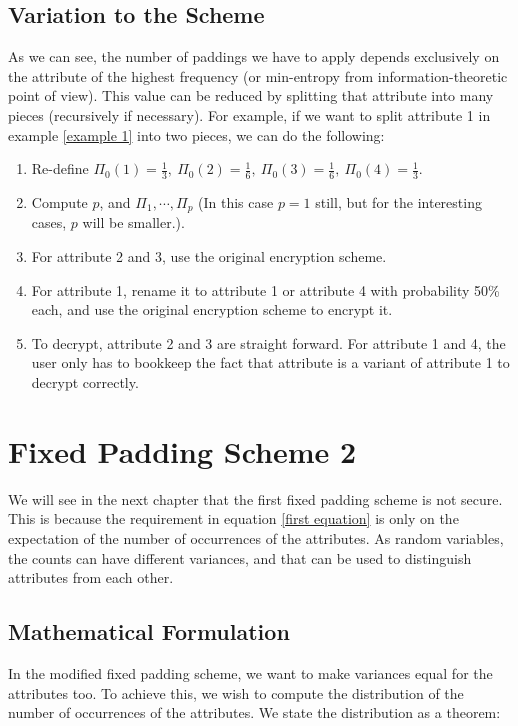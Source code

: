 \subsection{Variation to the Scheme} 
As we can see, the number of paddings we have to apply depends exclusively on the attribute of the highest frequency (or min-entropy from information-theoretic point of view). This value can be reduced by splitting that attribute into many pieces (recursively if necessary). For example, if we want to split attribute 1 in example \ref{example 1} into two pieces, we can do the following:
\begin{enumerate}
\item Re-define $\Pi_0(1) = \frac{1}{3}, \ \Pi_0(2) = \frac{1}{6}, \ \Pi_0(3) = \frac{1}{6}, \ \Pi_0(4) = \frac{1}{3}$.
\item Compute $p$, and $\Pi_1, \cdots, \Pi_p$ (In this case $p = 1$ still, but for the interesting cases, $p$ will be smaller.).
\item For attribute 2 and 3, use the original encryption scheme.
\item For attribute 1, rename it to attribute 1 or attribute 4 with probability 50\% each, and use the original encryption scheme to encrypt it.
\item To decrypt, attribute 2 and 3 are straight forward. For attribute 1 and 4, the user only has to bookkeep the fact that attribute is a variant of attribute 1 to decrypt correctly.
\end{enumerate}


\section{Fixed Padding Scheme 2}
We will see in the next chapter that the first fixed padding scheme is not secure. This is because the requirement in equation \ref{first equation} is only on the expectation of the number of occurrences of the attributes. As random variables, the counts can have different variances, and that can be used to distinguish attributes from each other.


\subsection{Mathematical Formulation}
In the modified fixed padding scheme, we want to make variances equal for the attributes too. To achieve this, we wish to compute the distribution of the number of occurrences of the attributes. We state the distribution as a theorem:


